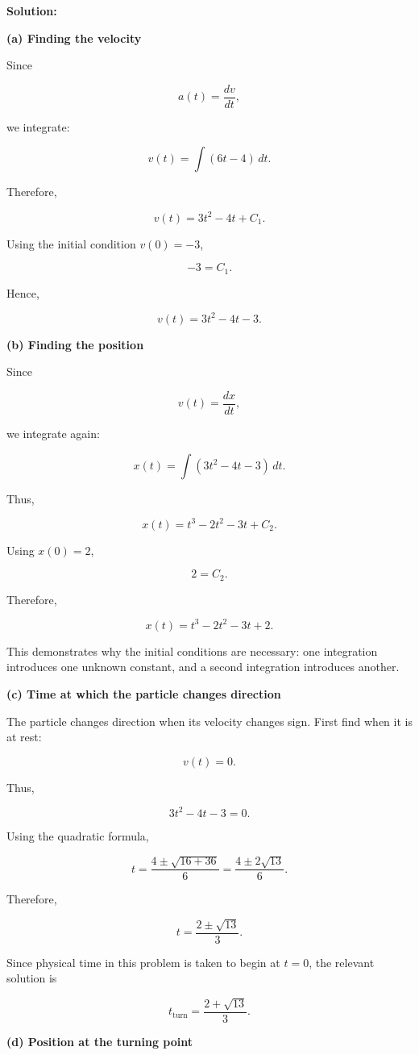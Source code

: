 \documentclass[../main.tex]{subfiles}
\theoremstyle{remark}
\begin{document}
\textbf{Solution:}

\textbf{(a) Finding the velocity}

Since

\[
a(t)=\frac{dv}{dt},
\]

we integrate:

\[
v(t)=\int (6t-4)\,dt.
\]

Therefore,

\[
v(t)=3t^2-4t+C_1.
\]

Using the initial condition \(v(0)=-3\),

\[
-3=C_1.
\]

Hence,

\[
\boxed{
v(t)=3t^2-4t-3.
}
\]

\textbf{(b) Finding the position}

Since

\[
v(t)=\frac{dx}{dt},
\]

we integrate again:

\[
x(t)
=
\int (3t^2-4t-3)\,dt.
\]

Thus,

\[
x(t)=t^3-2t^2-3t+C_2.
\]

Using \(x(0)=2\),

\[
2=C_2.
\]

Therefore,

\[
\boxed{
x(t)=t^3-2t^2-3t+2.
}
\]

This demonstrates why the initial conditions are necessary: one integration introduces one unknown constant, and a second integration introduces another.

\textbf{(c) Time at which the particle changes direction}

The particle changes direction when its velocity changes sign. First find when it is at rest:

\[
v(t)=0.
\]

Thus,

\[
3t^2-4t-3=0.
\]

Using the quadratic formula,

\[
t
=
\frac{4\pm\sqrt{16+36}}{6}
=
\frac{4\pm2\sqrt{13}}{6}.
\]

Therefore,

\[
t=\frac{2\pm\sqrt{13}}{3}.
\]

Since physical time in this problem is taken to begin at \(t=0\), the relevant solution is

\[
\boxed{
t_{\mathrm{turn}}
=
\frac{2+\sqrt{13}}{3}.
}
\]

\textbf{(d) Position at the turning point}
\end{document}
